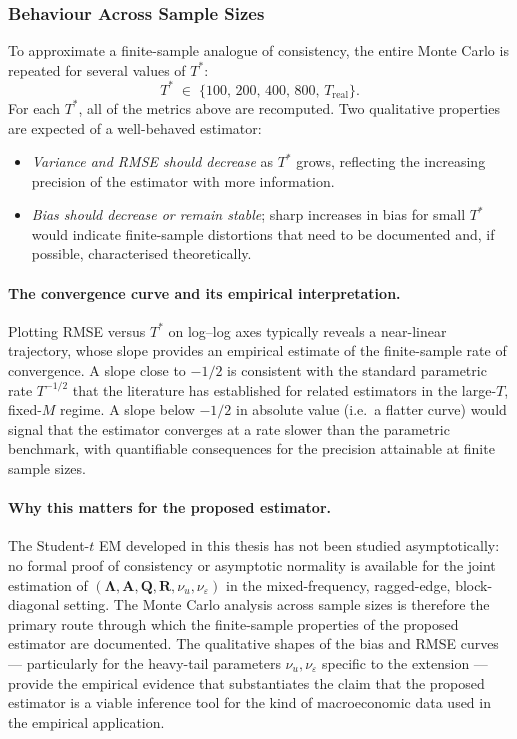 \documentclass[11pt, a4paper, oneside]{article}
\begin{document}
\subsubsection*{Behaviour Across Sample Sizes}

To approximate a finite-sample analogue of consistency, the entire
Monte Carlo is repeated for several values of $T^*$:
\[
T^* \;\in\; \{100,\, 200,\, 400,\, 800,\, T_{\mathrm{real}}\}.
\]
For each $T^*$, all of the metrics above are recomputed. Two
qualitative properties are expected of a well-behaved estimator:
\begin{itemize}[leftmargin=1.5em, itemsep=3pt]
    \item \emph{Variance and RMSE should decrease} as $T^*$ grows,
          reflecting the increasing precision of the estimator
          with more information.
    \item \emph{Bias should decrease or remain stable}; sharp
          increases in bias for small $T^*$ would indicate
          finite-sample distortions that need to be documented
          and, if possible, characterised theoretically.
\end{itemize}

\paragraph{The convergence curve and its empirical interpretation.}
Plotting RMSE versus $T^*$ on log--log axes typically reveals a
near-linear trajectory, whose slope provides an empirical estimate
of the finite-sample rate of convergence. A slope close to $-1/2$
is consistent with the standard parametric rate $T^{-1/2}$ that
the literature has established for related estimators in the
large-$T$, fixed-$M$ regime. A slope below $-1/2$ in absolute
value (i.e.\ a flatter curve) would signal that the estimator
converges at a rate slower than the parametric benchmark, with
quantifiable consequences for the precision attainable at finite
sample sizes.

\paragraph{Why this matters for the proposed estimator.}
The Student-$t$ EM developed in this thesis has not been studied
asymptotically: no formal proof of consistency or asymptotic
normality is available for the joint estimation of
$(\boldsymbol{\Lambda}, \mathbf{A}, \mathbf{Q}, \mathbf{R}, \nu_u, \nu_\varepsilon)$
in the mixed-frequency, ragged-edge, block-diagonal setting. The
Monte Carlo analysis across sample sizes is therefore the primary
route through which the finite-sample properties of the proposed
estimator are documented. The qualitative shapes of the bias and
RMSE curves — particularly for the heavy-tail parameters
$\nu_u, \nu_\varepsilon$ specific to the extension — provide the
empirical evidence that substantiates the claim that the proposed
estimator is a viable inference tool for the kind of
macroeconomic data used in the empirical application.
\end{document}
